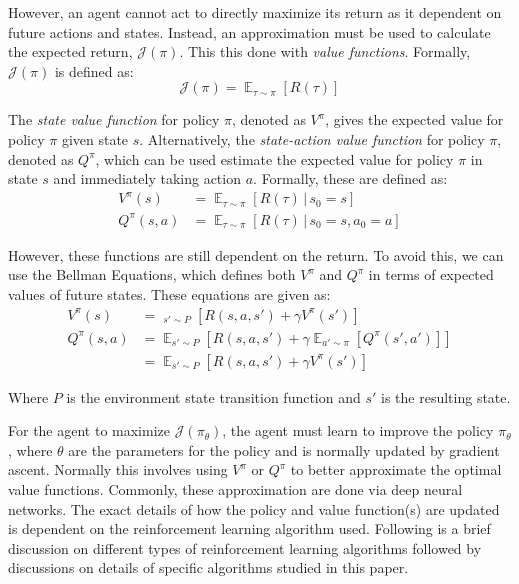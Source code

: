 \documentclass[conference]{IEEEtran}
\begin{document}
However, an agent cannot act to directly maximize its return as it dependent on future actions and states. Instead, an approximation must be used to calculate the expected return, $\mathcal{J}(\pi)$. This this done with \textit{value functions}. Formally, $\mathcal{J}(\pi)$ is defined as:
$$
    \mathcal{J}(\pi) = \mathop{\mathbb{E}}_{\tau \sim \pi}[R(\tau)]
$$

The \textit{state value function} for policy $\pi$, denoted as $V^\pi$, gives the expected value for policy $\pi$ given state $s$. Alternatively, the \textit{state-action value function} for policy $\pi$, denoted as $Q^\pi$, which can be used estimate the expected value for policy $\pi$ in state $s$ and immediately taking action $a$. Formally, these are defined as:
\begin{align*}
    V^\pi(s)    & = \mathop{\mathbb{E}}_{\tau \sim \pi}[R(\tau) \, | \, s_0 = s]          \\
    Q^\pi(s, a) & = \mathop{\mathbb{E}}_{\tau \sim \pi}[R(\tau) \, | \, s_0 = s, a_0 = a]
\end{align*}

However, these functions are still dependent on the return. To avoid this, we can use the Bellman Equations, which defines both $V^\pi$ and $Q^\pi$ in terms of expected values of future states. \cite{deep_rl_survey, spinning_up_intro, sutton2018reinforcement} These equations are given as:
\begin{align*}
    V^\pi(s)    & = \mathop{\mathop{\mathbb{E}}_{a \sim \pi}}_{s' \sim P} \left[ R(s, a, s') + \gamma V^\pi(s')\right]                  \\
    Q^\pi(s, a) & = \mathop{\mathbb{E}}_{s' \sim P} \left[ R(s, a, s') + \gamma\mathop{\mathbb{E}}_{a' \sim \pi} [Q^\pi(s', a')]\right] \\
                & = \mathop{\mathbb{E}}_{s' \sim P}\left [ R(s, a, s') + \gamma V^\pi(s') \right]
\end{align*}
\begin{flushleft}
    Where $P$ is the environment state transition function and $s'$ is the resulting state.
\end{flushleft}


For the agent to maximize $\mathcal{J}(\pi_\theta)$, the agent must learn to improve the policy $\pi_\theta$, where $\theta$ are the parameters for the policy and is normally updated by gradient ascent. Normally this involves using $V^\pi$ or $Q^\pi$ to better approximate the optimal value functions. Commonly, these approximation are done via deep neural networks. The exact details of how the policy and value function(s) are updated is dependent on the reinforcement learning algorithm used. Following is a brief discussion on different types of reinforcement learning algorithms followed by discussions on details of specific algorithms studied in this paper.
\end{document}
